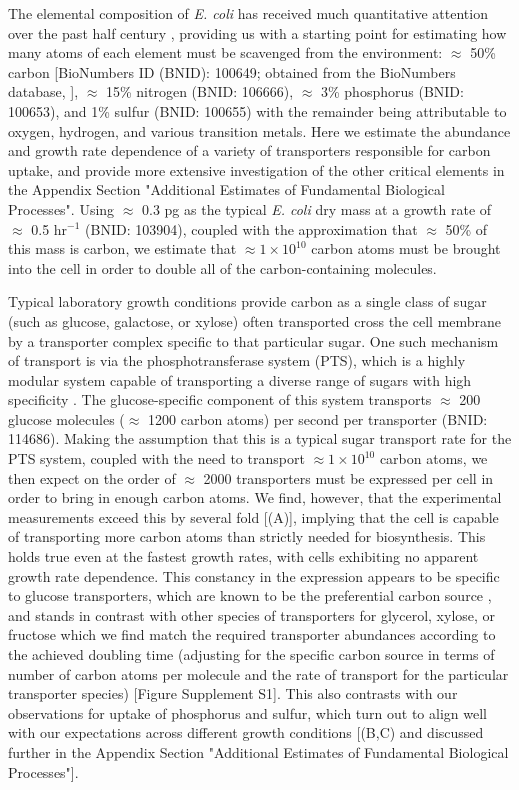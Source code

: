 The elemental composition of \textit{E. coli} has received much quantitative
attention over the past half century \citep{neidhardt1991, taymaz-nikerel2010,
heldal1985, bauer1976}, providing us with a starting point for estimating how
many atoms of each element must be scavenged from the environment: $\approx$
50\% carbon [BioNumbers ID (BNID): 100649; obtained from the BioNumbers database,
\cite{milo2010}], $\approx$ 15\% nitrogen (BNID: 106666), $\approx$ 3\% phosphorus
(BNID: 100653), and 1\% sulfur (BNID: 100655) with the remainder being
attributable to oxygen, hydrogen, and various transition metals.  Here we
estimate the abundance and growth rate dependence of a variety of transporters
responsible for carbon uptake, and provide more extensive investigation of the
other critical elements in the Appendix
Section "Additional Estimates of Fundamental Biological Processes". Using
$\approx$ 0.3 pg as the typical \textit{E. coli} dry mass at a growth rate of
$\approx$ 0.5 hr$^{-1}$ (BNID: 103904), coupled with the approximation that
$\approx$ 50\% of this mass is carbon, we estimate that $\approx 1\times
10^{10}$ carbon atoms must be brought into the cell in order to double all of
the carbon-containing molecules.

Typical laboratory growth conditions provide carbon as a single class of sugar
(such as glucose, galactose, or xylose) often transported cross the cell
membrane by a transporter complex specific to that particular sugar. One such
mechanism of transport is via the phosphotransferase system (PTS), which is a
highly modular system capable of transporting a diverse range of sugars with
high specificity \citep{escalante2012}. The glucose-specific component of this
system transports $\approx$ 200 glucose molecules ($\approx$ 1200 carbon atoms)
per second per transporter (BNID: 114686). Making the assumption that this is a
typical sugar transport rate for the PTS system, coupled with the need to
transport $\approx 1 \times 10^{10}$ carbon atoms, we then expect on the order
of $\approx$ 2000 transporters must be expressed per cell in order to bring in
enough carbon atoms. We find, however, that the experimental measurements exceed
this by several fold [(A)], implying that the cell
is capable of transporting more carbon atoms than strictly needed for
biosynthesis. This holds true even at the fastest growth rates, with cells
exhibiting no apparent growth rate dependence. This constancy in the expression
appears to be specific to glucose transporters, which are known to be the
preferential carbon source \citep{monod1947, liu2005a, aidelberg2014}, and
stands in contrast with other species of transporters for glycerol, xylose, or
fructose which we find match the required transporter abundances according to
the achieved doubling time (adjusting for the specific carbon source in terms of
number of carbon atoms per molecule and the rate of transport for the particular
transporter species) [Figure Supplement S1]. This also contrasts with our
observations for uptake of phosphorus and sulfur, which turn out to align well
with our expectations across different growth conditions
[(B,C) and discussed further in the Appendix
Section "Additional Estimates of Fundamental Biological Processes"].

